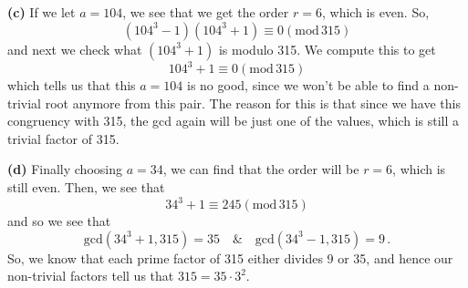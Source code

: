 \documentclass[10pt]{article}
\begin{document}
\textbf{(c)} If we let $a = 104$, we see that we get the order $r = 6$, which is even. So,
\[ (104^{3} - 1)(104^{3} + 1) \equiv 0 (\text{mod}\, 315) \]
and next we check what $(104^{3} + 1)$ is modulo 315. We compute this to get
\[ 104^{3} + 1 \equiv 0 (\text{mod}\, 315) \]
which tells us that this $a= 104$ is no good, since we won't be able to find a non-trivial root anymore from this pair. The reason for this is that since we have this congruency with 315, the gcd again will be just one of the values, which is still a trivial factor of 315.

\textbf{(d)} Finally choosing $a = 34$, we can find that the order will be $r = 6$, which is still even. Then, we see that
\[ 34^{3} + 1 \equiv 245 (\text{mod}\, 315) \]
and so we see that
\[ \text{gcd}(34^{3} + 1, 315) = 35 \quad \& \quad \text{gcd}(34^{3} - 1, 315) = 9\, .\]
So, we know that each prime factor of 315 either divides 9 or 35, and hence our non-trivial factors tell us that $315 = 35\cdot 3^{2}$. 
\end{document}

